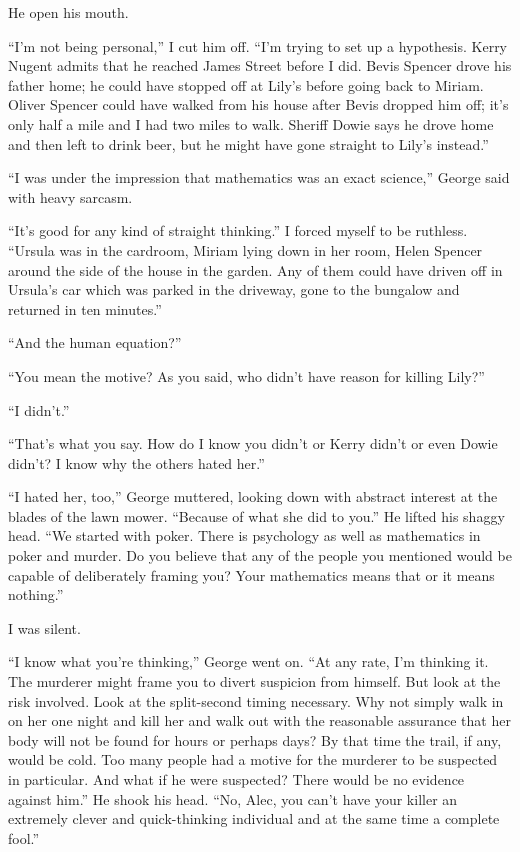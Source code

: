 \documentclass{novel}
\begin{document}
He open his mouth.

“I’m not being personal,” I cut him off. “I’m trying to set up a hypothesis. Kerry Nugent admits that he reached James Street before I did. Bevis Spencer drove his father home; he could have stopped off at Lily’s before going back to Miriam. Oliver Spencer could have walked from his house after Bevis dropped him off; it’s only half a mile and I had two miles to walk. Sheriff Dowie says he drove home and then left to drink beer, but he might have gone straight to Lily’s instead.”

“I was under the impression that mathematics was an exact science,” George said with heavy sarcasm.

“It’s good for any kind of straight thinking.” I forced myself to be ruthless. “Ursula was in the cardroom, Miriam lying down in her room, Helen Spencer around the side of the house in the garden. Any of them could have driven off in Ursula’s car which was parked in the driveway, gone to the bungalow and returned in ten minutes.”

“And the human equation?”

“You mean the motive? As you said, who didn’t have reason for killing Lily?”

“I didn’t.”

“That’s what you say. How do I know you didn’t or Kerry didn’t or even Dowie didn’t? I know why the others hated her.”

“I hated her, too,” George muttered, looking down with abstract interest at the blades of the lawn mower. “Because of what she did to you.” He lifted his shaggy head. “We started with poker. There is psychology as well as mathematics in poker and murder. Do you believe that any of the people you mentioned would be capable of deliberately framing you? Your mathematics means that or it means nothing.”

I was silent.

“I know what you’re thinking,” George went on. “At any rate, I’m thinking it. The murderer might frame you to divert suspicion from himself. But look at the risk involved. Look at the split-second timing necessary. Why not simply walk in on her one night and kill her and walk out with the reasonable assurance that her body will not be found for hours or perhaps days? By that time the trail, if any, would be cold. Too many people had a motive for the murderer to be suspected in particular. And what if he were suspected? There would be no evidence against him.” He shook his head. “No, Alec, you can’t have your killer an extremely clever and quick-thinking individual and at the same time a complete fool.”
\end{document}
